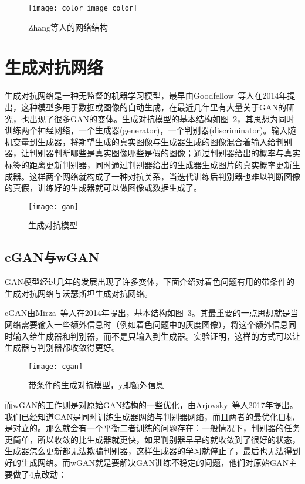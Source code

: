   \begin{figure}[H]
    \centering
    \texttt{[image: color\_image\_color]}
    \caption{Zhang等人的网络结构}
    \label{fig:color_image_color}
  \end{figure}

\section{生成对抗网络}
\label{sec:gan}

  生成对抗网络是一种无监督的机器学习模型，最早由Goodfellow~\cite{DBLP:conf/nips/GoodfellowPMXWOCB14}等人在2014年提出，这种模型多用于数据或图像的自动生成，在最近几年里有大量关于GAN的研究，也出现了很多GAN的变体。生成对抗模型的基本结构如图~\ref{fig:gan}，其思想为同时训练两个神经网络，一个生成器(generator)，一个判别器(discriminator)。输入随机变量到生成器，将期望生成的真实图像与生成器生成的图像混合着输入给判别器，让判别器判断哪些是真实图像哪些是假的图像；通过判别器给出的概率与真实标签的距离更新判别器，同时通过判别器给出的生成器生成图片的真实概率更新生成器。这样两个网络就构成了一种对抗关系，当迭代训练后判别器也难以判断图像的真假，训练好的生成器就可以做图像或数据生成了。

  \begin{figure}[H]
    \centering
    \texttt{[image: gan]}
    \caption{生成对抗模型}
    \label{fig:gan}
  \end{figure}

\subsection{cGAN与wGAN}
\label{sec:cgan-and-wgan}
  
  GAN模型经过几年的发展出现了许多变体，下面介绍对着色问题有用的带条件的生成对抗网络与沃瑟斯坦生成对抗网络。

  cGAN由Mirza~\cite{DBLP:journals/corr/MirzaO14}等人在2014年提出，基本结构如图~\ref{fig:cgan}。其最重要的一点思想就是当网络需要输入一些额外信息时（例如着色问题中的灰度图像），将这个额外信息同时输入给生成器和判别器，而不是只输入到生成器。实验证明，这样的方式可以让生成器与判别器都收敛得更好。

  \begin{figure}[H]
    \centering
    \texttt{[image: cgan]}
    \caption{带条件的生成对抗模型，y即额外信息}
    \label{fig:cgan}
  \end{figure}

  而wGAN的工作则是对原始GAN结构的一些优化，由Arjovsky~\cite{DBLP:journals/corr/ArjovskyCB17}等人2017年提出。我们已经知道GAN是同时训练生成器网络与判别器网络，而且两者的最优化目标是对立的。那么就会有一个平衡二者训练的问题存在：一般情况下，判别器的任务更简单，所以收敛的比生成器就更快，如果判别器早早的就收敛到了很好的状态，生成器怎么更新都无法欺骗判别器，这样生成器的学习就停止了，最后也无法得到好的生成网络。而wGAN就是要解决GAN训练不稳定的问题，他们对原始GAN主要做了4点改动：

